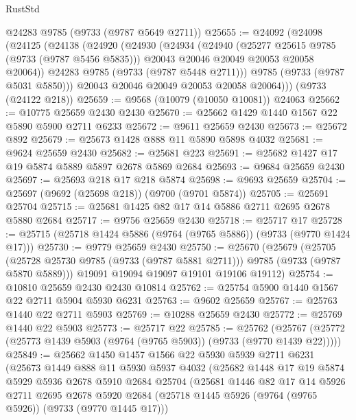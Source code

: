 \begin{lexlean}{RustStd}
\begin{coremodule}
{\begin{coremodule}
{{{{{{{{{{{{{{{{{{{{{{{{{{{{{{{{{{{{{{{{{{{{{{{{{{{{{{{    @24283
    @9785
    (@9733 (@9787 @5649 @2711))
@25655 := @24092
    (@24098
      (@24125
        (@24138
          (@24920
            (@24930
              (@24934
                (@24940
                  (@25277 @25615 @9785 (@9733 (@9787 @5456 @5835)))
                  @20043
                  @20046
                  @20049
                  @20053
                  @20058
                  @20064))
              @24283
              @9785
              (@9733 (@9787 @5448 @2711)))
            @9785
            (@9733 (@9787 @5031 @5850)))
          @20043
          @20046
          @20049
          @20053
          @20058
          @20064)))
    (@9733 (@24122 @218))
@25659 := @9568 (@10079 (@10050 @10081)) @24063
@25662 := @10775 @25659 @2430 @2430
@25670 := @25662 @1429 @1440 @1567 @22 @5890 @5900 @2711 @6233
@25672 := @9611 @25659 @2430
@25673 := @25672 @892
@25679 := @25673 @1428 @888 @11 @5890 @5898 @4032
@25681 := @9624 @25659 @2430
@25682 := @25681 @223
@25691 := @25682 @1427 @17 @19 @5874 @5889 @5897 @2678 @5869 @2684
@25693 := @9684 @25659 @2430
@25697 := @25693 @218 @17 @218 @5874
@25698 := @9693 @25659
@25704 := @25697 (@9692 (@25698 @218)) (@9700 (@9701 @5874))
@25705 := @25691 @25704
@25715 := @25681 @1425 @82 @17 @14 @5886 @2711 @2695 @2678 @5880 @2684
@25717 := @9756 @25659 @2430
@25718 := @25717 @17
@25728 := @25715 (@25718 @1424 @5886 (@9764 (@9765 @5886)) (@9733 (@9770 @1424 @17)))
@25730 := @9779 @25659 @2430
@25750 := @25670
    (@25679
      (@25705 (@25728 @25730 @9785 (@9733 (@9787 @5881 @2711))) @9785 (@9733 (@9787 @5870 @5889)))
      @19091
      @19094
      @19097
      @19101
      @19106
      @19112)
@25754 := @10810 @25659 @2430 @2430 @10814
@25762 := @25754 @5900 @1440 @1567 @22 @2711 @5904 @5930 @6231
@25763 := @9602 @25659
@25767 := @25763 @1440 @22 @2711 @5903
@25769 := @10288 @25659 @2430
@25772 := @25769 @1440 @22 @5903
@25773 := @25717 @22
@25785 := @25762
    (@25767 (@25772 (@25773 @1439 @5903 (@9764 (@9765 @5903)) (@9733 (@9770 @1439 @22)))))
@25849 := @25662
    @1450
    @1457
    @1566
    @22
    @5930
    @5939
    @2711
    @6231
    (@25673
      @1449
      @888
      @11
      @5930
      @5937
      @4032
      (@25682
        @1448
        @17
        @19
        @5874
        @5929
        @5936
        @2678
        @5910
        @2684
        @25704
        (@25681
          @1446
          @82
          @17
          @14
          @5926
          @2711
          @2695
          @2678
          @5920
          @2684
          (@25718 @1445 @5926 (@9764 (@9765 @5926)) (@9733 (@9770 @1445 @17)))
}}}}}}}}}}}}}}}}}}}}}}}}}}}}}}}}}}}}}}}}}}}}}}}}}}}}}}}
\end{coremodule}}
\end{coremodule}
\end{lexlean}
